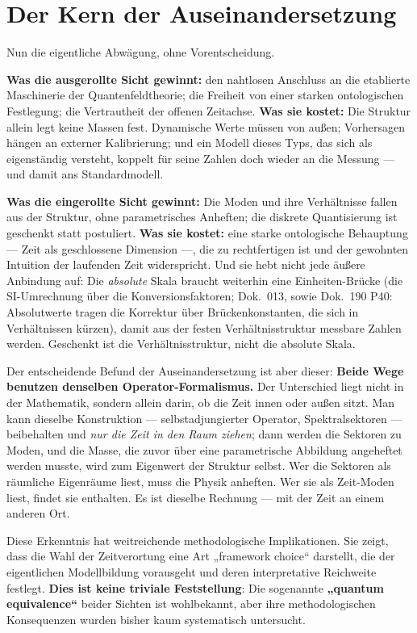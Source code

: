 \section{Der Kern der Auseinandersetzung}

Nun die eigentliche Abwägung, ohne Vorentscheidung.

\textbf{Was die ausgerollte Sicht gewinnt:} den nahtlosen Anschluss an die etablierte Maschinerie der Quantenfeldtheorie; die Freiheit von einer starken ontologischen Festlegung; die Vertrautheit der offenen Zeitachse. \textbf{Was sie kostet:} Die Struktur allein legt keine Massen fest. Dynamische Werte müssen von außen; Vorhersagen hängen an externer Kalibrierung; und ein Modell dieses Typs, das sich als eigenständig versteht, koppelt für seine Zahlen doch wieder an die Messung --- und damit ans Standardmodell.

\textbf{Was die eingerollte Sicht gewinnt:} Die Moden und ihre Verhältnisse fallen aus der Struktur, ohne parametrisches Anheften; die diskrete Quantisierung ist geschenkt statt postuliert. \textbf{Was sie kostet:} eine starke ontologische Behauptung --- Zeit als geschlossene Dimension ---, die zu rechtfertigen ist und der gewohnten Intuition der laufenden Zeit widerspricht. Und sie hebt nicht jede äußere Anbindung auf: Die \emph{absolute} Skala braucht weiterhin eine Einheiten-Brücke (die SI-Umrechnung über die Konversionsfaktoren; Dok.~013, sowie Dok.~190 P40: Absolutwerte tragen die Korrektur über Brückenkonstanten, die sich in Verhältnissen kürzen), damit aus der festen Verhältnisstruktur messbare Zahlen werden. Geschenkt ist die Verhältnisstruktur, nicht die absolute Skala.

Der entscheidende Befund der Auseinandersetzung ist aber dieser: \textbf{Beide Wege benutzen denselben Operator-Formalismus.} Der Unterschied liegt nicht in der Mathematik, sondern allein darin, ob die Zeit innen oder außen sitzt. Man kann dieselbe Konstruktion --- selbstadjungierter Operator, Spektralsektoren --- beibehalten und \emph{nur die Zeit in den Raum ziehen}; dann werden die Sektoren zu Moden, und die Masse, die zuvor über eine parametrische Abbildung angeheftet werden musste, wird zum Eigenwert der Struktur selbst. Wer die Sektoren als räumliche Eigenräume liest, muss die Physik anheften. Wer sie als Zeit-Moden liest, findet sie enthalten. Es ist dieselbe Rechnung --- mit der Zeit an einem anderen Ort.

Diese Erkenntnis hat weitreichende methodologische Implikationen. Sie zeigt, dass die Wahl der Zeitverortung eine Art „framework choice`` darstellt, die der eigentlichen Modellbildung vorausgeht und deren interpretative Reichweite festlegt. \textbf{Dies ist keine triviale Feststellung}: Die sogenannte \textbf{„quantum equivalence``} beider Sichten ist wohlbekannt, aber ihre methodologischen Konsequenzen wurden bisher kaum systematisch untersucht.

